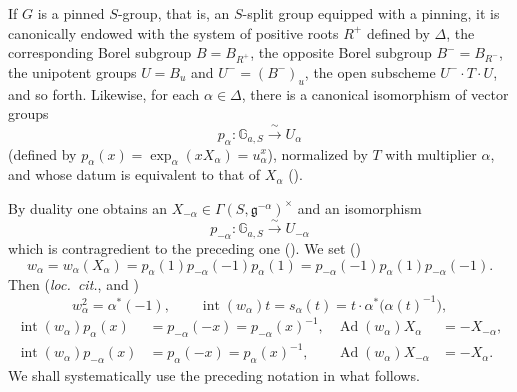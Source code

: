If \(G\) is a pinned \(S\)-group, that is, an \(S\)-split group
equipped with a pinning, it is canonically endowed with the system of
positive roots \(R^+\) defined by \(\Delta\), the corresponding Borel
subgroup \(B=B_{R^+}\), the opposite Borel subgroup \(B^-=B_{R^-}\),
the unipotent groups \(U=B_u\) and \(U^-=(B^-)_{u}\), the open
subscheme \(U^-\cdot T\cdot U\), and so forth. Likewise, for each
\(\alpha\in\Delta\), there is a canonical isomorphism of vector groups
\[
  p_\alpha:\mathbb G_{a,S}\xrightarrow{\ \sim\ }U_\alpha
\]
(defined by \(p_\alpha(x)=\exp_\alpha(xX_\alpha)=u_\alpha^x\)), normalized by \(T\)
with multiplier \(\alpha\), and whose datum is
equivalent to that of \(X_\alpha\) ().

By duality one obtains an
\(X_{-\alpha}\in\Gamma(S,\mathfrak g^{-\alpha})^\times\) and an
isomorphism
\[
  p_{-\alpha}:\mathbb G_{a,S}\xrightarrow{\ \sim\ }U_{-\alpha}
\]
which is contragredient to the preceding one (). We
set ()
\[
  w_\alpha=w_\alpha(X_\alpha)
  =p_\alpha(1)p_{-\alpha}(-1)p_\alpha(1)
  =p_{-\alpha}(-1)p_\alpha(1)p_{-\alpha}(-1).
\]
Then (\textit{loc.\ cit.},  and )
\[
  w_\alpha^2=\alpha^\ast(-1),\qquad
  \operatorname{int}(w_\alpha)t
    =s_\alpha(t)=t\cdot\alpha^\ast\!\bigl(\alpha(t)^{-1}\bigr),
\]
\[
\begin{aligned}
  \operatorname{int}(w_\alpha)p_\alpha(x)
    &=p_{-\alpha}(-x)=p_{-\alpha}(x)^{-1},&
  \operatorname{Ad}(w_\alpha)X_\alpha&=-X_{-\alpha},\\
  \operatorname{int}(w_\alpha)p_{-\alpha}(x)
    &=p_\alpha(-x)=p_\alpha(x)^{-1},&
  \operatorname{Ad}(w_\alpha)X_{-\alpha}&=-X_\alpha .
\end{aligned}
\]
We shall systematically use the preceding notation in what follows.


